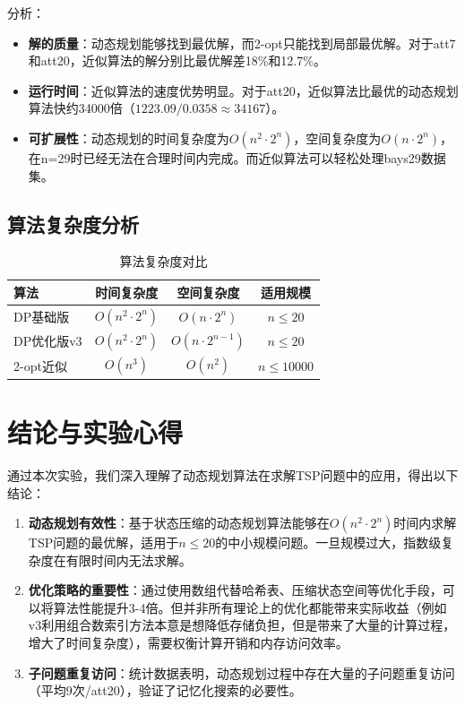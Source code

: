 \documentclass[UTF8,12pt,a4paper]{ctexart}
\begin{document}
分析：
\begin{itemize}
	\item \textbf{解的质量}：动态规划能够找到最优解，而2-opt只能找到局部最优解。对于att7和att20，近似算法的解分别比最优解差18\%和12.7\%。
	
	\item \textbf{运行时间}：近似算法的速度优势明显。对于att20，近似算法比最优的动态规划算法快约34000倍（$1223.09 / 0.0358 \approx 34167$）。
	
	\item \textbf{可扩展性}：动态规划的时间复杂度为$O(n^2 \cdot 2^n)$，空间复杂度为$O(n \cdot 2^n)$，在n=29时已经无法在合理时间内完成。而近似算法可以轻松处理bays29数据集。
\end{itemize}

\subsection{算法复杂度分析}

\begin{table}[H]
	\centering
	\begin{tabular}{lccc}
		\toprule
		算法 & 时间复杂度 & 空间复杂度 & 适用规模 \\
		\midrule
		DP基础版 & $O(n^2 \cdot 2^n)$ & $O(n \cdot 2^n)$ & $n \leq 20$ \\
		DP优化版v3 & $O(n^2 \cdot 2^n)$ & $O(n \cdot 2^{n-1})$ & $n \leq 20$ \\
		2-opt近似 & $O(n^3)$ & $O(n^2)$ & $n \leq 10000$ \\
		\bottomrule
	\end{tabular}
	\caption{算法复杂度对比}
\end{table}

\newpage

\section{结论与实验心得}

通过本次实验，我们深入理解了动态规划算法在求解TSP问题中的应用，得出以下结论：

\begin{enumerate}
	\item \textbf{动态规划有效性}：基于状态压缩的动态规划算法能够在$O(n^2 \cdot 2^n)$时间内求解TSP问题的最优解，适用于$n \leq 20$的中小规模问题。一旦规模过大，指数级复杂度在有限时间内无法求解。
	
	\item \textbf{优化策略的重要性}：通过使用数组代替哈希表、压缩状态空间等优化手段，可以将算法性能提升3-4倍。但并非所有理论上的优化都能带来实际收益（例如v3利用组合数索引方法本意是想降低存储负担，但是带来了大量的计算过程，增大了时间复杂度），需要权衡计算开销和内存访问效率。
	
	\item \textbf{子问题重复访问}：统计数据表明，动态规划过程中存在大量的子问题重复访问（平均9次/att20），验证了记忆化搜索的必要性。
\end{enumerate}
\end{document}

